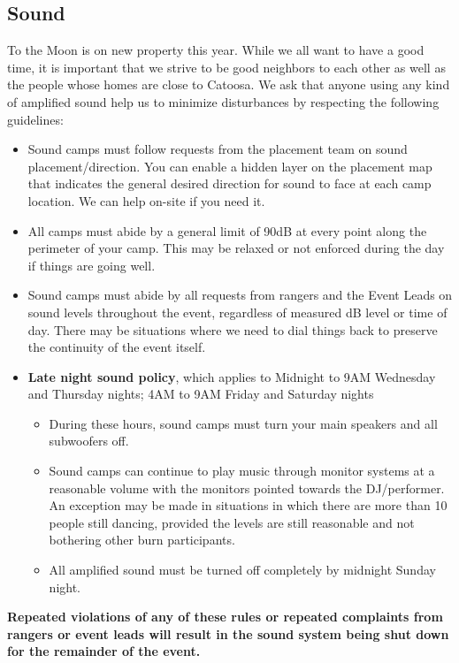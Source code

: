 \subsection*{Sound}
To the Moon is on new property this year.  While we all want to have a good time, it is important that we strive to be good neighbors to each other as well as the people whose homes are close to Catoosa.  We ask that anyone using any kind of amplified sound help us to minimize disturbances by respecting the following guidelines:

\begin{itemize}[noitemsep]
    \item Sound camps must follow requests from the placement team on sound  placement/direction.  You can enable a hidden layer on the placement map that indicates the general desired direction for sound to face at each camp location.  We can help on-site if you need it.
    \item All camps must abide by a general limit of 90dB at every point along the perimeter of your camp.  This may be relaxed or not enforced during the day if things are going well.
    \item Sound camps must abide by all requests from rangers and the Event Leads on sound levels throughout the event, regardless of measured dB level or time of day.  There may be situations where we need to dial things back to preserve the continuity of the event itself.
    \item \textbf{Late night sound policy}, which applies to Midnight to 9AM Wednesday and Thursday nights; 4AM to 9AM Friday and Saturday nights
    \begin{itemize}
        \item During these hours, sound camps must turn your main speakers and all subwoofers off.
        \item Sound camps can continue to play music through monitor systems at a reasonable volume with the monitors pointed towards the DJ/performer.  An exception may be made in situations in which there are more than 10 people still dancing, provided the levels are still reasonable and not bothering other burn participants.
        \item All amplified sound must be turned off completely by midnight Sunday night.
    \end{itemize}
\end{itemize}

\textbf{Repeated violations of any of these rules or repeated complaints from rangers or event leads will result in the sound system being shut down for the remainder of the event.}

